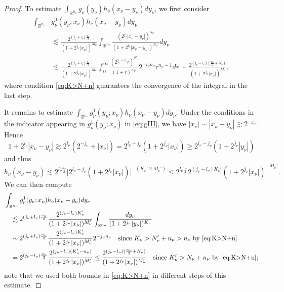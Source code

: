 \documentclass[11pt, reqno]{amsart}
\theoremstyle{definition}
\theoremstyle{remark}
\numberwithin{equation}{section}
\newcommand{\R}{\mathbb R}
\newcommand{\abs}[1]{|#1|}
\begin{document}
\begin{proof}
To estimate $\int_{\R^{n_\nu}} g_\nu(y_\nu)h_\nu(x_\nu-y_\nu)dy_\nu$, we first consider
\begin{equation}\label{eq:g0}
\begin{split}
  \int_{\R^{n_\nu}} &g_\nu^0(y_\nu;x_\nu)h_\nu(x_\nu-y_\nu)dy_\nu\\
  &\lesssim \frac{2^{(j_\nu+l_\nu)\frac{n_\nu}{2}}}{(1+2^{j_\nu}\abs{x_\nu})^{M_\nu}}
  \int_{\R^{n_\nu}}
  \frac{(2^{j_\nu}\abs{x_\nu-y_\nu})^{N_\nu}}{(1+2^{l_\nu}\abs{x_\nu-y_\nu})^{K_\nu'}}dy_\nu \\
  &\lesssim \frac{2^{(j_\nu+l_\nu)\frac{n_\nu}{2}}}{(1+2^{j_\nu}\abs{x_\nu})^{M_\nu}}
  \int_0^\infty\frac{(2^{j_\nu-l_\nu}r)^{N_\nu}}{(1+r)^{K_\nu'}} 2^{-l_\nu n_\nu}r^{n_\nu-1}dr
  \sim\frac{2^{(j_\nu-l_\nu)(\frac{n_\nu}{2}+N_\nu)}}{(1+2^{j_\nu}\abs{x_\nu})^{M_\nu}},
\end{split}
\end{equation}
where condition \eqref{eq:K>N+n} guarantees the convergence of the integral in the last step.

It remains to estimate $\int_{\R^{n_\nu}} g_\nu^1(y_\nu;x_\nu)h_\nu(x_\nu-y_\nu)dy_\nu$.
Under the conditions in the indicator appearing in $g_\nu^1(y_\nu;x_\nu)$ in \eqref{eq:gIII}, we have $\abs{x_\nu}\sim\abs{x_\nu-y_\nu}\gtrsim 2^{-j_\nu}$. Hence
\begin{equation*}
  1+2^{l_\nu}\abs{x_\nu-y_\nu}
  \gtrsim 2^{l_\nu}(2^{-j_\nu}+\abs{x_\nu})=2^{l_\nu-j_\nu}(1+2^{j_\nu}\abs{x_\nu})
  \geq 2^{l_\nu-j_\nu}(1+2^{j_\nu}\abs{y_\nu})
\end{equation*}
and thus
\begin{equation*}
  h_{\nu}(x_\nu-y_\nu)\lesssim 2^{l_\nu\frac{n_\nu}{2}}\Big[2^{l_\nu-j_\nu}(1+2^{j_\nu}\abs{x_\nu})\Big]^{-(K_\nu'\vee M_\nu')}
  \leq 2^{l_\nu\frac{n_\nu}{2}} 2^{(j_\nu-l_\nu)K_\nu'}(1+2^{j_\nu}\abs{x_\nu})^{-M_\nu'}.
\end{equation*}
We can then compute
\begin{equation*}
\begin{split}
  &\int_{\R^{n_\nu}} g_\nu^1(y_\nu;x_\nu) h_\nu(x_\nu-y_\nu)dy_\nu\\
  &\quad\lesssim 2^{(j_\nu+l_\nu)\frac{n_\nu}{2}} \frac{2^{(j_\nu-l_\nu)K_\nu'}}{(1+2^{j_\nu}\abs{x_\nu})^{M_\nu'}}
  \int_{\R^{n_\nu}} \frac{dy_\nu}{(1+2^{j_\nu}\abs{y_\nu})^{K_\nu}} \\
  &\quad\sim 2^{(j_\nu+l_\nu)\frac{n_\nu}{2}} \frac{2^{(j_\nu-l_\nu)K_\nu'}}{(1+2^{j_\nu}\abs{x_\nu})^{M_\nu'}}2^{-j_\nu n_\nu} \quad
  \text{since $K_\nu>N_\nu'+n_\nu> n_\nu$ by \eqref{eq:K>N+n}} \\
  &\quad= 2^{(j_\nu-l_\nu)\frac{n_\nu}{2}} \frac{2^{(j_\nu-l_\nu)(K_\nu'-n_\nu)}}{(1+2^{j_\nu}\abs{x_\nu})^{M_\nu'}}
  \leq\frac{2^{(j_\nu-l_\nu)(\frac{n_\nu}{2}+N_\nu)}}{(1+2^{j_\nu}\abs{x_\nu})^{M_\nu'}}\quad
  \text{since $K_\nu'>N_\nu+n_\nu$ by \eqref{eq:K>N+n}};
\end{split}
\end{equation*}
note that we used both bounds in \eqref{eq:K>N+n} in different steps of this estimate.


\end{proof}
\end{document}
